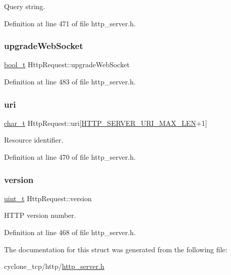 Query string. 



Definition at line 471 of file http\+\_\+server.\+h.

\mbox{\label{structHttpRequest_ab11c6dedab0273a26fc5f50c8ebea434}} 
\subsubsection{\texorpdfstring{upgrade\+Web\+Socket}{upgradeWebSocket}}
{\footnotesize\ttfamily \hyperlink{compiler__port_8h_a812d16e5494522586b3784e55d479912}{bool\+\_\+t} Http\+Request\+::upgrade\+Web\+Socket}



Definition at line 483 of file http\+\_\+server.\+h.

\mbox{\label{structHttpRequest_adc115cd5bdbed3c91bff676af17fd8dc}} 
\subsubsection{\texorpdfstring{uri}{uri}}
{\footnotesize\ttfamily \hyperlink{compiler__port_8h_a40bb5262bf908c328fbcfbe5d29d0201}{char\+\_\+t} Http\+Request\+::uri\mbox{[}\hyperlink{http__server_8h_aad636f905c4ba1aa4f135adbada5a70b}{H\+T\+T\+P\+\_\+\+S\+E\+R\+V\+E\+R\+\_\+\+U\+R\+I\+\_\+\+M\+A\+X\+\_\+\+L\+EN}+1\mbox{]}}



Resource identifier. 



Definition at line 470 of file http\+\_\+server.\+h.

\mbox{\label{structHttpRequest_a567b3f16eede34c4f3a2f926688445ad}} 
\subsubsection{\texorpdfstring{version}{version}}
{\footnotesize\ttfamily \hyperlink{compiler__port_8h_a12a1e9b3ce141648783a82445d02b58d}{uint\+\_\+t} Http\+Request\+::version}



H\+T\+TP version number. 



Definition at line 468 of file http\+\_\+server.\+h.



The documentation for this struct was generated from the following file\+:\begin{DoxyCompactItemize}
\item 
cyclone\+\_\+tcp/http/\hyperlink{http__server_8h}{http\+\_\+server.\+h}\end{DoxyCompactItemize}
